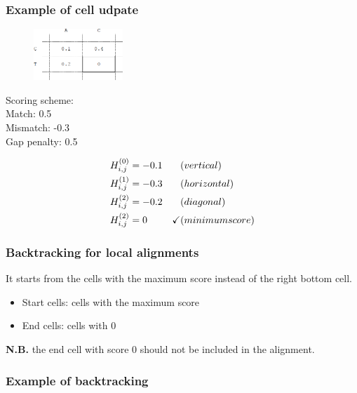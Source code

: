 \subsubsection*{Example of cell udpate}
\begin{multicols}{2}
\begin{figure}[H]
  \centering
      \includegraphics[width=0.3\textwidth]{fig04/local_alignment_cell_update.png}
\end{figure}

\noindent Scoring scheme: \\ 
\null \quad Match: 0.5 \\ 
\null \quad Mismatch: -0.3 \\ 
\null \quad Gap penalty: 0.5

\end{multicols} 

\begin{align*}
H_{i,j}^{(0)} &=  -0.1 &\hfill &(vertical) \\
H_{i,j}^{(1)} &= -0.3 &\hfill &(horizontal) \\
H_{i,j}^{(2)} &= -0.2 &\hfill &(diagonal) \\
H_{i,j}^{(2)} &= 0 & \checkmark &(minimum score)
\end{align*}
\medskip 

%
%
\subsubsection*{Backtracking for local alignments}
It starts from the cells with the maximum score instead of the right bottom cell.

\begin{itemize}
\item Start cells: cells with the maximum score 
\item End cells: cells with 0
\end{itemize}

\noindent
\textbf{N.B.} the end cell with score 0 should not be included in the alignment.

%
%
\subsubsection*{Example of backtracking}

